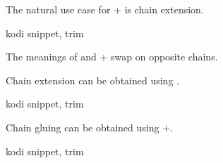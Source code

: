 The natural use case for {\ttfamily +} is chain extension.

\begin{tcblisting}{kodi snippet, trim}
\end{tcblisting}

The meanings of {\ttfamily *} and {\ttfamily +} swap on opposite chains.

Chain extension can be obtained using {\ttfamily *}.

\begin{tcblisting}{kodi snippet, trim}
\end{tcblisting}

Chain gluing can be obtained using {\ttfamily +}.

\begin{tcblisting}{kodi snippet, trim}
\end{tcblisting}

\endgroup
